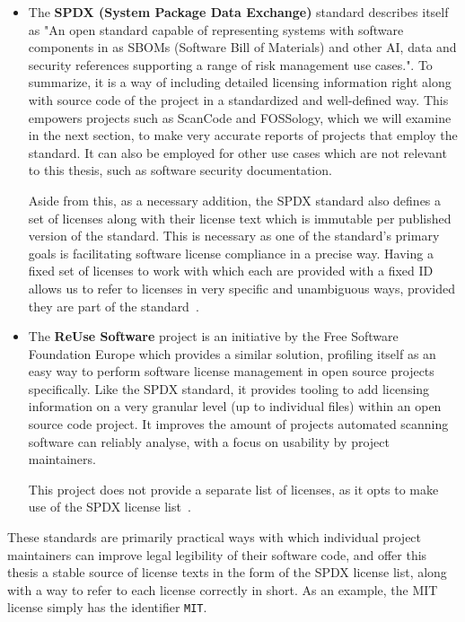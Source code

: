 \begin{itemize}
	\item The \textbf{SPDX (System Package Data Exchange)} standard describes itself as "An open standard capable of representing systems with software components in as SBOMs (Software Bill of Materials) and other AI, data and security references supporting a range of risk management use cases.". To summarize, it is a way of including detailed licensing information right along with source code of the project in a standardized and well-defined way. This empowers projects such as ScanCode and FOSSology, which we will examine in the next section, to make very accurate reports of projects that employ the standard. It can also be employed for other use cases which are not relevant to this thesis, such as software security documentation.
	
	Aside from this, as a necessary addition, the SPDX standard also defines a set of licenses along with their license text which is immutable per published version of the standard. This is necessary as one of the standard's primary goals is facilitating software license compliance in a precise way. Having a fixed set of licenses to work with which each are provided with a fixed ID allows us to refer to licenses in very specific and unambiguous ways, provided they are part of the standard~\cite{spdx-home,spdx-licenses,spdx-explanation-1}.
	
	\item The \textbf{ReUse Software} project is an initiative by the Free Software Foundation Europe which provides a similar solution, profiling itself as an easy way to perform software license management in open source projects specifically. Like the SPDX standard, it provides tooling to add licensing information on a very granular level (up to individual files) within an open source code project. It improves the amount of projects automated scanning software can reliably analyse, with a focus on usability by project maintainers.
	
	This project does not provide a separate list of licenses, as it opts to make use of the SPDX license list~\cite{reuse-project-home}.
\end{itemize}

These standards are primarily practical ways with which individual project maintainers can improve legal legibility of their software code, and offer this thesis a stable source of license texts in the form of the SPDX license list, along with a way to refer to each license correctly in short. As an example, the MIT license simply has the identifier \verb*|MIT|. \\

